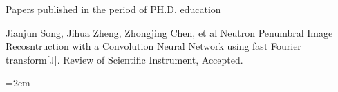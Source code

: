 
 {Papers
published in the period of PH.D. education}
\setlength{\parindent}{0em}
\begin{publist}
\item	Jianjun Song, Jihua Zheng, Zhongjing Chen, et al Neutron Penumbral Image Recosntruction with a Convolution Neural Network using fast Fourier transform[J]. Review of Scientific Instrument,  Accepted.

\end{publist}
\vfill
{}\hangindent=2em\noindent

\setlength{\parindent}{2em}
